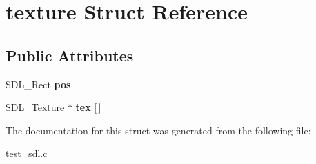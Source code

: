 \hypertarget{structtexture}{}\section{texture Struct Reference}
\label{structtexture}
\subsection*{Public Attributes}
\begin{DoxyCompactItemize}
\item 
\mbox{\label{structtexture_a1eb7ee9710c4e3e6f47093a7a470cee4}} 
S\+D\+L\+\_\+\+Rect {\bfseries pos}
\item 
\mbox{\label{structtexture_a81d311256d6a3b2ac865f4e8ab9305a3}} 
S\+D\+L\+\_\+\+Texture $\ast$ {\bfseries tex} \mbox{[}$\,$\mbox{]}
\end{DoxyCompactItemize}


The documentation for this struct was generated from the following file\+:\begin{DoxyCompactItemize}
\item 
\mbox{\hyperlink{test__sdl_8c}{test\+\_\+sdl.\+c}}\end{DoxyCompactItemize}
